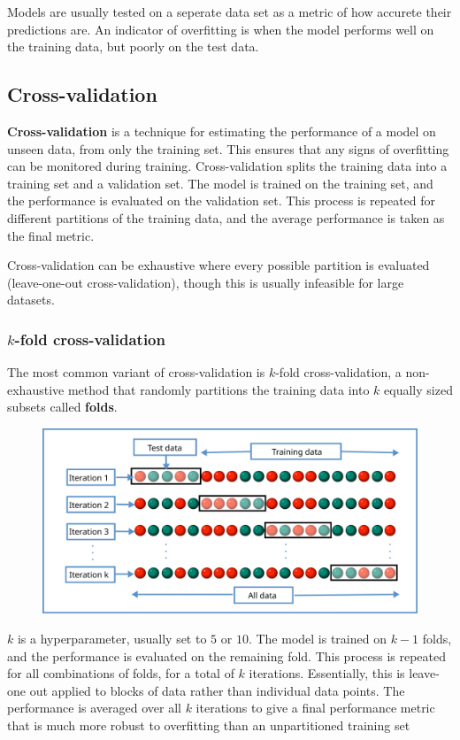 \documentclass[12pt]{report}
\theoremstyle{definition}
\theoremstyle{remark}
\begin{document}
Models are usually tested on a seperate data set as a metric of how accurete their predictions are. An indicator of overfitting is when the model performs well on the training data, but poorly on the test data.

\subsection{Cross-validation}
\textbf{Cross-validation} is a technique for estimating the performance of a model on unseen data, from only the training set. This ensures that any signs of overfitting can be monitored during training. Cross-validation splits the training data into a training set and a validation set. The model is trained on the training set, and the performance is evaluated on the validation set. This process is repeated for different partitions of the training data, and the average performance is taken as the final metric.

Cross-validation can be exhaustive where every possible partition is evaluated (leave-one-out cross-validation), though this is usually infeasible for large datasets.

\subsubsection{$k$-fold cross-validation}
The most common variant of cross-validation is $k$-fold cross-validation, a non-exhaustive method that randomly partitions the training data into $k$ equally sized subsets called \textbf{folds}.

\begin{figure}[h]
    \centering
    \includegraphics[width=\linewidth]{figs/kfold_cross_validation.png}
    \caption{}
    \label{fig:enter-label}
\end{figure}

$k$ is a hyperparameter, usually set to $5$ or $10$. The model is trained on $k-1$ folds, and the performance is evaluated on the remaining fold. This process is repeated for all combinations of folds, for a total of $k$ iterations. Essentially, this is leave-one out applied to blocks of data rather than individual data points. The performance is averaged over all $k$ iterations to give a final performance metric that is much more robust to overfitting than an unpartitioned training set
\end{document}
